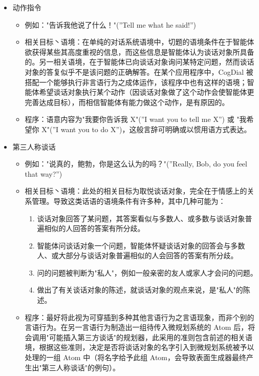 \begin{itemize}
\item 动作指令
\begin{itemize}
\item 例如："告诉我他说了什么！"(”Tell me what he said!”)
\item 相关目标丶语境：在单纯的对话系统语境中，切题的语境条件在于智能体欲获得某些其高度重视的信息，而这些信息是智能体认为谈话对象所具备的。另一相关语境，在于智能体已向谈话对象询问某特定问题，然而谈话对象的答复似乎不是该问题的正确解答。在某个应用程序中，CogDial 被搭配一个能够执行非言语行为之成体运作，该程序中也有这样的语境；智能体希望谈话对象执行某个动作（因谈话对象做了这个动作会使智能体更完善达成目标），而相信智能体有能力做这个动作，是有原因的。 
\item 程序：语意内容为"我要你告诉我 X"(”I want you to tell me X”) 或 "我希望你 X"(”I want you to do X”)，这般言辞可明确或以惯用语方式表达。
\end{itemize}


\item 第三人称谈话
\begin{itemize}
\item 例如："说真的，鲍勃，你是这么认为的吗？"(”Really, Bob, do you feel that way?”)
\item 相关目标丶语境：此处的相关目标为取悦谈话对象，完全在于情感上的关系管理。导致这类话语的语境条件有许多种，其中几种可能为： 
\begin{enumerate}
\item 谈话对象回答了某问题，其答案看似与多数人、或多数与谈话对象普遍相似的人回答的答案有所分歧。
\item 智能体问谈话对象一个问题，智能体怀疑谈话对象的回答会与多数人、或大部分与谈话对象普遍相似的人会回答的答案有所分歧。 
\item 问的问题被判断为"私人"，例如一般亲密的友人或家人才会问的问题。
\item 做出了有关谈话对象的陈述，就谈话对象的观点来说，是"私人"的陈述。 
\end{enumerate}
\item 程序：最好将此视为可穿插到多种其他言语行为之言语现象，而非个别的言语行为。在另一言语行为制造出一组待传入微规划系统的 Atom 后，将会调用"可能插入第三方谈话"的规划器，此采用的准则包含前述的相关语境，根据这些准则，决定是否将谈话对象的名字引入到微规划系统被予以处理的一组 Atom 中（将名字给予此组 Atom，会导致表面生成器最终产生出"第三人称谈话"的例句）。

\end{itemize}
\end{itemize}



